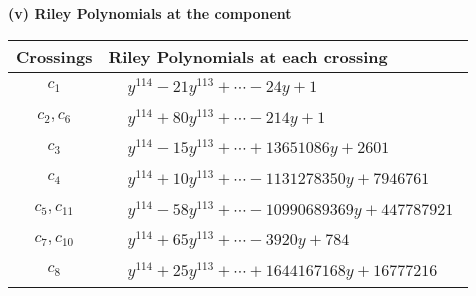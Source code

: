 \documentclass[1p]{elsarticle_modified}
\theoremstyle{definition}
\begin{document}
\newpage\renewcommand{\arraystretch}{1}
\flushleft \textbf{(v) Riley Polynomials at the component}\newline \\
\begin{tabular}{m{50pt}|m{274pt}}
Crossings & \hspace{64pt}Riley Polynomials at each crossing \\
\hline $$\begin{aligned}c_{1}\end{aligned}$$&$\begin{aligned}
&y^{114}-21 y^{113}+\cdots-24 y+1
\end{aligned}$\\
\hline $$\begin{aligned}c_{2},c_{6}\end{aligned}$$&$\begin{aligned}
&y^{114}+80 y^{113}+\cdots-214 y+1
\end{aligned}$\\
\hline $$\begin{aligned}c_{3}\end{aligned}$$&$\begin{aligned}
&y^{114}-15 y^{113}+\cdots+13651086 y+2601
\end{aligned}$\\
\hline $$\begin{aligned}c_{4}\end{aligned}$$&$\begin{aligned}
&y^{114}+10 y^{113}+\cdots-1131278350 y+7946761
\end{aligned}$\\
\hline $$\begin{aligned}c_{5},c_{11}\end{aligned}$$&$\begin{aligned}
&y^{114}-58 y^{113}+\cdots-10990689369 y+447787921
\end{aligned}$\\
\hline $$\begin{aligned}c_{7},c_{10}\end{aligned}$$&$\begin{aligned}
&y^{114}+65 y^{113}+\cdots-3920 y+784
\end{aligned}$\\
\hline $$\begin{aligned}c_{8}\end{aligned}$$&$\begin{aligned}
&y^{114}+25 y^{113}+\cdots+1644167168 y+16777216
\end{aligned}$\\

\end{tabular}
\end{document}
